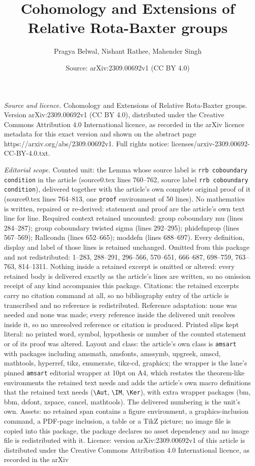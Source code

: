 \documentclass[10pt,a4paper]{amsart}
\title[Cohomology and Extensions of Relative Rota-Baxter groups]{Cohomology and Extensions of Relative Rota-Baxter groups}
\author{Pragya Belwal, Nishant Rathee, Mahender Singh}
\date{Source: arXiv:2309.00692v1 (CC BY 4.0)}
\begin{document}
\maketitle

\noindent\emph{Source and licence.} Cohomology and Extensions of Relative Rota-Baxter groups. Version arXiv:2309.00692v1 (CC BY 4.0), distributed under the Creative Commons Attribution 4.0 International licence, as recorded in the arXiv licence metadata for this exact version and shown on the abstract page https://arxiv.org/abs/2309.00692v1. Full rights notice: licenses/arxiv-2309.00692-CC-BY-4.0.txt.\par\smallskip

\noindent\textit{Editorial scope.} Counted unit: the Lemma whose source label is \texttt{rrb coboundary condition} in the article (source0.tex lines 760--762, source label \texttt{rrb coboundary condition}), delivered together with the article's own complete original proof of it (source0.tex lines 764--813, one \texttt{proof} environment of 50 lines). No mathematics is written, repaired or re-derived: statement and proof are the article's own text line for line. Required context retained uncounted: group coboundary mu (lines 284--287); group coboundary twisted sigma (lines 292--295); phidefnprop (lines 567--569); Rallcondn (lines 652--665); moddefn (lines 688--697). Every definition, display and label of those lines is retained unchanged. Omitted from this package and not redistributed: 1--283, 288--291, 296--566, 570--651, 666--687, 698--759, 763--763, 814--1311. Nothing inside a retained excerpt is omitted or altered: every retained body is delivered exactly as the article's lines are written, so no omission receipt of any kind accompanies this package. Citations: the retained excerpts carry no citation command at all, so no bibliography entry of the article is transcribed and no reference is redistributed. Reference adaptation: none was needed and none was made; every reference inside the delivered unit resolves inside it, so no unresolved reference or citation is produced. Printed slips kept literal: no printed word, symbol, hypothesis or number of the counted statement or of its proof was altered. Layout and class: the article's own class is \texttt{amsart} with packages including amsmath, amsfonts, amssymb, upgreek, amscd, mathtools, hyperref, tikz, enumerate, tikz-cd, graphicx; the wrapper is the lane's pinned \texttt{amsart} editorial wrapper at 10pt on A4, which restates the theorem-like environments the retained text needs and adds the article's own macro definitions that the retained text needs (\texttt{\textbackslash Aut}, \texttt{\textbackslash IM}, \texttt{\textbackslash Ker}), with extra wrapper packages (bm, bbm, dsfont, xspace, cancel, mathtools). The delivered numbering is the unit's own. Assets: no retained span contains a figure environment, a graphics-inclusion command, a PDF-page inclusion, a table or a TikZ picture; no image file is copied into this package, the package declares no asset dependency and no image file is redistributed with it. Licence: version arXiv:2309.00692v1 of this article is distributed under the Creative Commons Attribution 4.0 International licence, as recorded in the arXiv 
\end{document}

